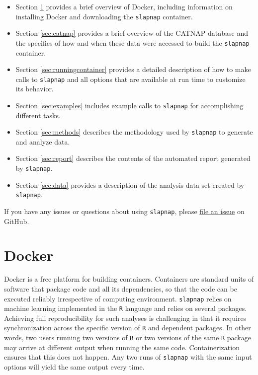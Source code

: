 \documentclass[]{article}
\providecommand{\tightlist}{%
  \setlength{\itemsep}{0pt}\setlength{\parskip}{0pt}}
\begin{document}
\begin{itemize}
\tightlist
\item
  Section \ref{sec:docker} provides a brief overview of Docker,
  including information on installing Docker and downloading the
  \texttt{slapnap} container.
\item
  Section \ref{sec:catnap} provides a brief overview of the CATNAP
  database and the specifics of how and when these data were accessed to
  build the \texttt{slapnap} container.
\item
  Section \ref{sec:runningcontainer} provides a detailed description of
  how to make calls to \texttt{slapnap} and all options that are
  available at run time to customize its behavior.
\item
  Section \ref{sec:examples} includes example calls to \texttt{slapnap}
  for accomplishing different tasks.
\item
  Section \ref{sec:methods} describes the methodology used by
  \texttt{slapnap} to generate and analyze data.
\item
  Section \ref{sec:report} describes the contents of the automated
  report generated by \texttt{slapnap}.
\item
  Section \ref{sec:data} provides a description of the analysis data set
  created by \texttt{slapnap}.
\end{itemize}

If you have any issues or questions about using \texttt{slapnap}, please
\href{https://github.com/benkeser/slapnap/issues}{file an issue} on
GitHub.

\section{Docker}\label{sec:docker}

Docker is a free platform for building containers. Containers are
standard units of software that package code and all its dependencies,
so that the code can be executed reliably irrespective of computing
environment. \texttt{slapnap} relies on machine learning implemented in
the \texttt{R} language and relies on several packages. Achieving full
reproducibility for such analyses is challenging in that it requires
synchronization across the specific version of \texttt{R} and dependent
packages. In other words, two users running two versions of \texttt{R}
or two versions of the same \texttt{R} package may arrive at different
output when running the same code. Containerization ensures that this
does not happen. Any two runs of \texttt{slapnap} with the same input
options will yield the same output every time.
\end{document}
